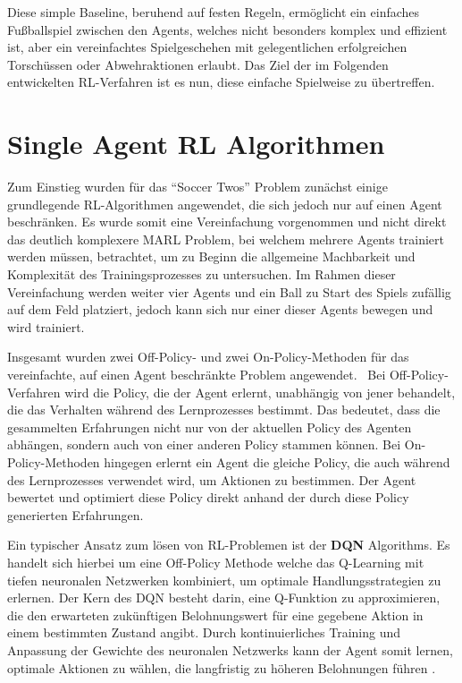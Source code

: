 Diese simple Baseline, beruhend auf festen Regeln, ermöglicht ein einfaches Fußballspiel zwischen den Agents, welches nicht besonders komplex und effizient ist, aber ein vereinfachtes Spielgeschehen mit gelegentlichen erfolgreichen Torschüssen oder Abwehraktionen erlaubt. Das Ziel der im Folgenden entwickelten \ac{RL}-Verfahren ist es nun, diese einfache Spielweise zu übertreffen.


\section{Single Agent RL Algorithmen}

Zum Einstieg wurden für das \enquote{Soccer Twos} Problem zunächst einige grundlegende \ac{RL}-Algorithmen angewendet, die sich jedoch nur auf einen Agent beschränken. Es wurde somit eine Vereinfachung vorgenommen und nicht direkt das deutlich komplexere \ac{MARL} Problem, bei welchem mehrere Agents trainiert werden müssen, betrachtet, um zu Beginn die allgemeine Machbarkeit und Komplexität des Trainingsprozesses zu untersuchen. Im Rahmen dieser Vereinfachung werden weiter vier Agents und ein Ball zu Start des Spiels zufällig auf dem Feld platziert, jedoch kann sich nur einer dieser Agents bewegen und wird trainiert. 

Insgesamt wurden zwei Off-Policy- und zwei On-Policy-Methoden für das vereinfachte, auf einen Agent beschränkte Problem angewendet. 
Bei Off-Policy-Verfahren wird die Policy, die der Agent erlernt, unabhängig von jener behandelt, die das Verhalten während des Lernprozesses bestimmt. Das bedeutet, dass die gesammelten Erfahrungen nicht nur von der aktuellen Policy des Agenten abhängen, sondern auch von einer anderen Policy stammen können.
Bei On-Policy-Methoden hingegen erlernt ein Agent die gleiche Policy, die auch während des Lernprozesses verwendet wird, um Aktionen zu bestimmen. Der Agent bewertet und optimiert diese Policy direkt anhand der durch diese Policy generierten Erfahrungen.

Ein typischer Ansatz zum lösen von \ac{RL}-Problemen ist der \textbf{\ac{DQN}} Algorithms. Es handelt sich hierbei um eine Off-Policy Methode welche das Q-Learning mit tiefen neuronalen Netzwerken kombiniert, um optimale Handlungsstrategien zu erlernen. Der Kern des \ac{DQN} besteht darin, eine Q-Funktion zu approximieren, die den erwarteten zukünftigen Belohnungswert für eine gegebene Aktion in einem bestimmten Zustand angibt. %
Durch kontinuierliches Training und Anpassung der Gewichte des neuronalen Netzwerks kann der Agent somit lernen, optimale Aktionen zu wählen, die langfristig zu höheren Belohnungen führen \cite{mnih2013}. 

